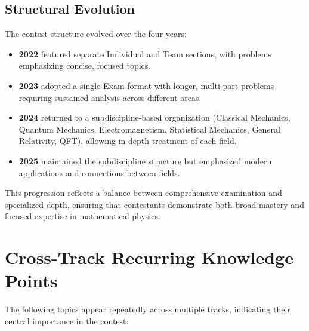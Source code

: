 \subsection{Structural Evolution}

The contest structure evolved over the four years:

\begin{itemize}
\item \textbf{2022} featured separate Individual and Team sections, with problems emphasizing concise, focused topics.
\item \textbf{2023} adopted a single Exam format with longer, multi-part problems requiring sustained analysis across different areas.
\item \textbf{2024} returned to a subdiscipline-based organization (Classical Mechanics, Quantum Mechanics, Electromagnetism, Statistical Mechanics, General Relativity, QFT), allowing in-depth treatment of each field.
\item \textbf{2025} maintained the subdiscipline structure but emphasized modern applications and connections between fields.
\end{itemize}

This progression reflects a balance between comprehensive examination and specialized depth, ensuring that contestants demonstrate both broad mastery and focused expertise in mathematical physics.

\section{Cross-Track Recurring Knowledge Points}
\label{sec:recurring}

The following topics appear repeatedly across multiple tracks, indicating their central importance in the contest:


